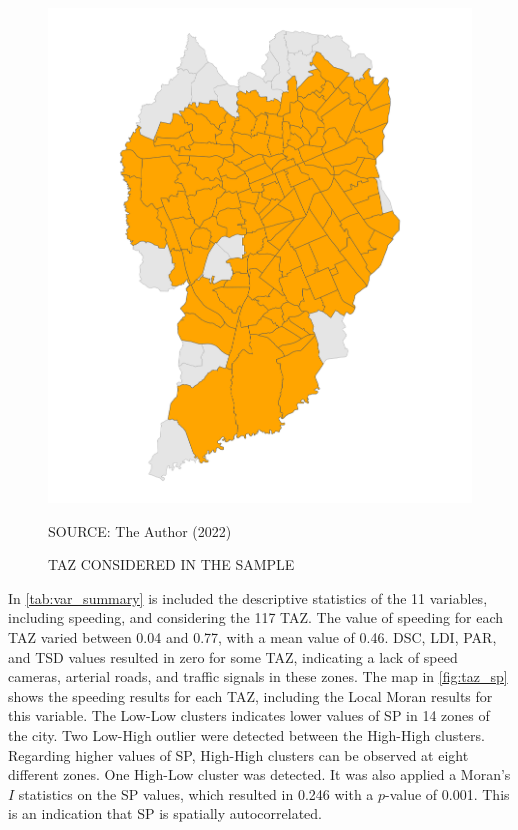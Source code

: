 \begin{figure}[!htbp]
    \centering\footnotesize
    \captionsetup{font=footnotesize}
    \caption{TAZ CONSIDERED IN THE SAMPLE}
    \includegraphics{fig/map_removal.png}
    \label{fig:taz_filter}
    \par SOURCE: The Author (2022)
\end{figure}


In \autoref{tab:var_summary} is included the descriptive statistics of the 11 variables, including speeding, and considering the 117 TAZ. The value of speeding for each TAZ varied between 0.04 and 0.77, with a mean value of 0.46.  DSC, LDI, PAR, and TSD values resulted in zero for some TAZ, indicating a lack of speed cameras, arterial roads, and traffic signals in these zones. The map in \autoref{fig:taz_sp} shows the speeding results for each TAZ, including the Local Moran results for this variable. The Low-Low clusters indicates lower values of SP in 14 zones of the city. Two Low-High outlier were detected between the High-High clusters. Regarding higher values of SP, High-High clusters can be observed at eight different zones. One High-Low cluster was detected. It was also applied a Moran's $I$ statistics on the SP values, which resulted in 0.246 with a $p$-value of 0.001. This is an indication that SP is spatially autocorrelated.

